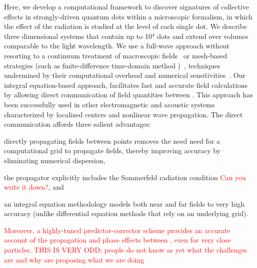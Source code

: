 Here, we develop a computational framework to discover signatures of collective effects in strongly-driven quantum dots within a microscopic formalism, in which the effect of the radiation is studied at the level of each single dot. We describe three dimensional systems that contain up to 10$^4$ dots and extend over  volumes comparable to the light wavelength. We use a full-wave approach without resorting to a continuum treatment of macroscopic fields~\cite{} or mesh-based strategies (such as finite-difference time-domain method )~\cite{Vanneste2001, Fratalocchi2008}, techniques undermined by their computational overhead and numerical sensitivities~\cite{Baczewski2013}. Our integral equation-based approach, facilitates fast and accurate field calculations by allowing direct communication of field quantities between \qds{}. This approach has been successfully used in other electromagnetic\cite{otherpapersfromshanker} and acoustic\cite{yourPRE} systems characterized by localized centers and nonlinear wave propagation.
The direct communication affords three salient advantages:
  \begin{inparaenum}[(i)]
    \item directly propagating fields between points removes the need need for a computational grid to propagate fields, thereby improving accuracy by eliminating numerical dispersion,
    \item the propagator explicitly includes the Sommerfeld radiation condition \textcolor{red}{Can you write it down?}, and
    \item an integral equation methodology models both near and far fields to very high accuracy (unlike differential equation methods that rely on an underlying grid).
  \end{inparaenum}
\textcolor{red}{Moreover, a highly-tuned predictor-corrector scheme provides an accurate account of the propagation and phase effects between \qds{}, even for very close particles.
THIS IS VERY ODD; people do not know as yet what the challenges are and why are proposing what we are doing}

